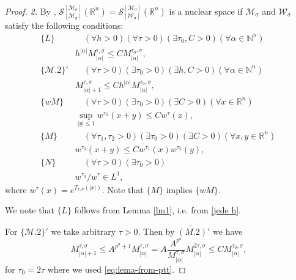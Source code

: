\documentclass{article}
\theoremstyle{thmstyleone}
\theoremstyle{thmstyletwo}%
\theoremstyle{thmstylethree}%
\begin{document}
\begin{proof}



{\em 2.} By \cite[Theorem 5.1]{DNV2021},  $\mathcal S_{[\mathcal{M}_\sigma ] }^{ [\mathcal{M}_\sigma]} (\mathbb R^n)=\mathcal S_{[\mathcal{W}_\sigma ] }^{ [\mathcal{M}_\sigma]} (\mathbb R^n)$ is a nuclear space if $\mathcal{M}_{\sigma}$ and $\mathcal{W}_{\sigma}$ satisfy the following conditions:
\begin{align*}
\{L\}&\quad (\forall h>0)(\forall \tau>0)(\exists \tau_0,C>0)(\forall \alpha \in \mathbb N^{n})\\ &  h^{|\alpha|} M^{\tau,\sigma}_{|\alpha|}\leq C M^{\tau_0,\sigma}_{|\alpha|} ,\\
\{\mathcal{M}.2\}'&\quad (\forall \tau>0)(\exists \tau_0>0)(\exists h,C>0)(\forall \alpha \in \mathbb N^{n})\\ &  M^{\tau,\sigma}_{|\alpha|+1}\leq C h^{|\alpha|} M^{\tau_0,\sigma}_{|\alpha|}, \\
\{wM\}&\quad (\forall \tau>0) (\exists \tau_0>0)(\exists C>0) (\forall x\in \mathbb{R}^n)\\\ & \sup_{|y|\leq 1} w^{\tau_0}(x+y)\leq C w^{\tau}(x),\\
\{M\}& \quad (\forall \tau_1,\tau_2>0) (\exists \tau_0>0)(\exists C>0) (\forall x,y\in \mathbb{R}^n)\, \\ & w^{\tau_0}(x+y)\leq C w^{\tau_1}(x)w^{\tau_2}(y),\\
\{N\}&\quad (\forall \tau>0)(\exists \tau_0>0) \\ & w^{\tau_0}/w^{\tau}\in L^1,
\end{align*} where $w^{\tau}(x)=e^{T_{\tau,\sigma}(|x|)}$. Note that $\{M\}$ implies $\{wM\}$.

We note that $\{L\}$ follows from Lemma \ref{lm1}, i.e. from \eqref{jede h}.




For $\{\mathcal{M}.2\}'$ we take arbitrary $\tau>0$. Then by $\widetilde{(M.2)}'$ we have
$$
M^{\tau,\sigma}_{|\alpha|+1}\leq A^{p^{\sigma}+1} M^{\tau,\sigma}_{|\alpha|}=  A \frac{A^{p^{\sigma}}}{M^{\tau,\sigma}_{|\alpha|}} M^{2\tau,\sigma}_{|\alpha|}\leq C M^{\tau_0,\sigma}_{|\alpha|},
$$ for $\tau_0= 2\tau$ where we used \eqref{eq:lema-from-ptt}.


\end{proof}
\end{document}
